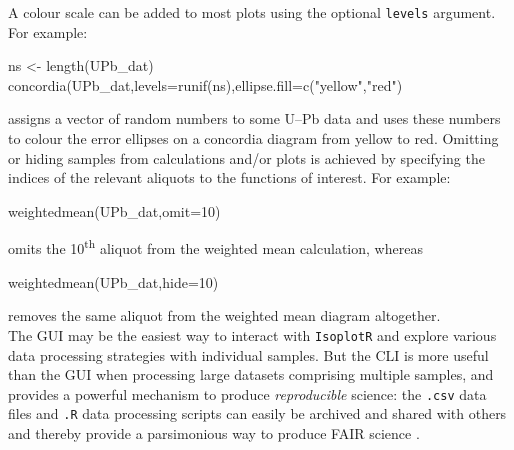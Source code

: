 \begin{refsection}
A colour scale can be added to most plots using the optional
\texttt{levels} argument. For example:

\begin{script}[firstnumber=2]
ns <- length(UPb_dat)
concordia(UPb_dat,levels=runif(ns),ellipse.fill=c("yellow","red")
\end{script}

\noindent assigns a vector of random numbers to some U--Pb data and
uses these numbers to colour the error ellipses on a concordia diagram
from yellow to red. Omitting or hiding samples from calculations
and/or plots is achieved by specifying the indices of the relevant
aliquots to the functions of interest. For example:

\begin{script}[firstnumber=2]
weightedmean(UPb_dat,omit=10)
\end{script}

\noindent omits the 10\textsuperscript{th} aliquot from the weighted
mean calculation, whereas

\begin{script}[firstnumber=2]
weightedmean(UPb_dat,hide=10)
\end{script}

\noindent removes the same aliquot from the weighted mean diagram
altogether.\\

The GUI may be the easiest way to interact with \texttt{IsoplotR} and
explore various data processing strategies with individual
samples. But the CLI is more useful than the GUI when processing large
datasets comprising multiple samples, and provides a powerful
mechanism to produce \emph{reproducible} science: the \texttt{.csv}
data files and \texttt{.R} data processing scripts can easily be
archived and shared with others and thereby provide a parsimonious way
to produce FAIR science \citep{wilkinson2016}.

\printbibliography[heading=subbibliography]
\end{refsection}
